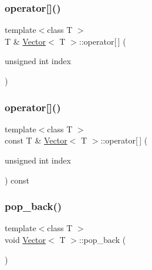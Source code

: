 \mbox{\label{classVector_a8b133b35c069989a02ed3db7e78cae02_a8b133b35c069989a02ed3db7e78cae02}} 
\subsubsection{\texorpdfstring{operator[]()}{operator[]()}\hspace{0.1cm}{\footnotesize\ttfamily [1/2]}}
{\footnotesize\ttfamily template$<$class T $>$ \\
T \& \hyperlink{classVector}{Vector}$<$ T $>$\+::operator\mbox{[}$\,$\mbox{]} (\begin{DoxyParamCaption}\item[{unsigned int}]{index }\end{DoxyParamCaption})}

\mbox{\label{classVector_acf16259cd87643c68adfa44a0ff44eee_acf16259cd87643c68adfa44a0ff44eee}} 
\subsubsection{\texorpdfstring{operator[]()}{operator[]()}\hspace{0.1cm}{\footnotesize\ttfamily [2/2]}}
{\footnotesize\ttfamily template$<$class T $>$ \\
const T \& \hyperlink{classVector}{Vector}$<$ T $>$\+::operator\mbox{[}$\,$\mbox{]} (\begin{DoxyParamCaption}\item[{unsigned int}]{index }\end{DoxyParamCaption}) const}

\mbox{\label{classVector_adcba035109febbe55cba2a25f8483ba6_adcba035109febbe55cba2a25f8483ba6}} 
\subsubsection{\texorpdfstring{pop\+\_\+back()}{pop\_back()}}
{\footnotesize\ttfamily template$<$class T $>$ \\
void \hyperlink{classVector}{Vector}$<$ T $>$\+::pop\+\_\+back (\begin{DoxyParamCaption}{ }\end{DoxyParamCaption})}

